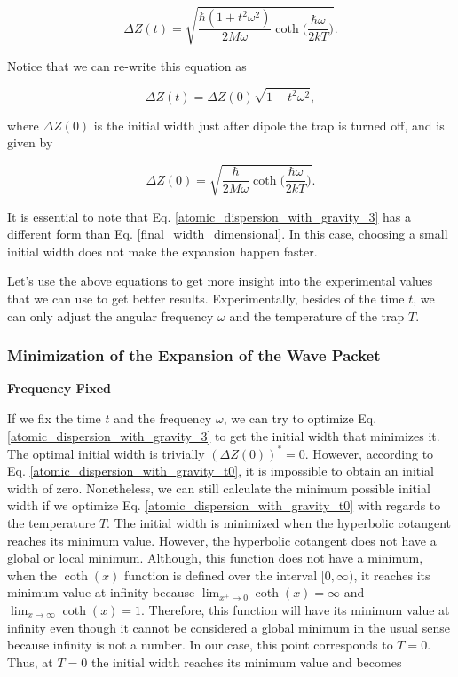 \documentclass{article}
\begin{document}
\begin{equation}\label{atomic_dispersion_with_gravity_2}
    \Delta Z (t) = \sqrt{\frac{\hbar (1+t^{2} \omega^{2})}{2 M \omega} \coth \bigg(\frac{\hbar \omega}{2 kT} \bigg)}.
\end{equation}

Notice that we can re-write this equation as

\begin{equation}\label{atomic_dispersion_with_gravity_3}
    \Delta Z (t) = \Delta Z(0) \sqrt{1+t^{2}\omega^{2}},
\end{equation}

where $\Delta Z(0)$ is the initial width just after dipole the trap is turned off, and is given by

\begin{equation}\label{atomic_dispersion_with_gravity_t0}
    \Delta Z(0) = \sqrt{\frac{\hbar}{2M \omega} \coth \bigg(\frac{\hbar \omega}{2kT} \bigg)}.
\end{equation}

It is essential to note that Eq. \ref{atomic_dispersion_with_gravity_3} has a different form than Eq. \ref{final_width_dimensional}. In this case, choosing a small initial width does not make the expansion happen faster.

Let's use the above equations to get more insight into the experimental values that we can use to get better results. Experimentally, besides of the time $t$, we can only adjust the angular frequency $\omega$ and the temperature of the trap $T$.

\subsubsection{Minimization of the Expansion of the Wave Packet}
\textbf{Frequency Fixed}

If we fix the time $t$ and the frequency $\omega$, we can try to optimize Eq. \ref{atomic_dispersion_with_gravity_3} to get the initial width that minimizes it. The optimal initial width is trivially $(\Delta Z(0))^{*}=0$. However, according to Eq. \ref{atomic_dispersion_with_gravity_t0}, it is impossible to obtain an initial width of zero. Nonetheless, we can still calculate the minimum possible initial width if we optimize Eq. \ref{atomic_dispersion_with_gravity_t0} with regards to the temperature $T$. The initial width is minimized when the hyperbolic cotangent reaches its minimum value. However, the hyperbolic cotangent does not have a global or local minimum. Although, this function does not have a minimum, when the $\coth(x)$ function is defined over the interval $[0,\infty)$, it reaches its minimum value at infinity because $\lim_{x^{+} \to 0} \coth(x)=\infty$ and $\lim_{x \to \infty} \coth(x)=1$. Therefore, this function will have its minimum value at infinity even though it cannot be considered a global minimum in the usual sense because infinity is not a number. In our case, this point corresponds to $T= 0$. Thus, at $T=0$ the initial width reaches its minimum value and becomes
\end{document}
